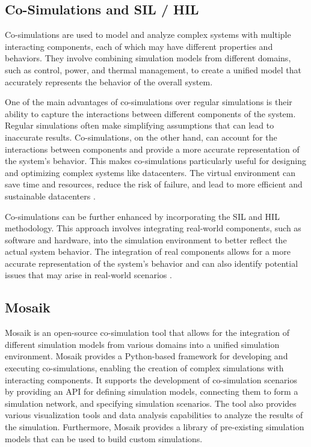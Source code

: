 \subsection{Co-Simulations and SIL / HIL}

Co-simulations are used to model and analyze complex systems with multiple
interacting components, each of which may have different properties and
behaviors. They involve combining simulation models from different domains, such
as control, power, and thermal management, to create a unified model that
accurately represents the behavior of the overall system.

One of the main advantages of co-simulations over regular simulations is their
ability to capture the interactions between different components of the system.
Regular simulations often make simplifying assumptions that can lead to
inaccurate results. Co-simulations, on the other hand, can account for the
interactions between components and provide a more accurate representation of
the system's behavior. This makes co-simulations particularly useful for
designing and optimizing complex systems like datacenters. The virtual
environment can save time and resources, reduce the risk of failure, and lead to
more efficient and sustainable datacenters \cite{vogt2018}.

Co-simulations can be further enhanced by incorporating the SIL and HIL
methodology. This approach involves integrating real-world components, such as
software and hardware, into the simulation environment to better reflect the
actual system behavior. The integration of real components allows for a more
accurate representation of the system's behavior and can also identify potential
issues that may arise in real-world scenarios \cite{kelemenova2013}.

\subsection{Mosaik}

Mosaik is an open-source co-simulation tool that allows for the integration of
different simulation models from various domains into a unified simulation
environment. Mosaik provides a Python-based framework for developing and
executing co-simulations, enabling the creation of complex simulations with
interacting components. It supports the development of co-simulation scenarios
by providing an API for defining simulation models, connecting them to form a
simulation network, and specifying simulation scenarios. The tool also provides
various visualization tools and data analysis capabilities to analyze the
results of the simulation. Furthermore, Mosaik provides a library of
pre-existing simulation models that can be used to build custom simulations.

